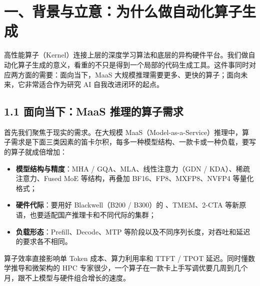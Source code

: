 \ReportContents
\SourceSeparator
\clearpage
\section{一、背景与立意：为什么做自动化算子生成}
高性能算子（Kernel）连接上层的深度学习算法和底层的异构硬件平台。我们做自动化算子生成的意义，看重的不只是得到一个局部的代码生成工具。这件事同时对应两方面的需要：面向当下，MaaS 大规模推理需要更多、更快的算子；面向未来，它非常适合作为研究 AI 自我改进闭环的起点。


\begin{DiagramBlock}
\end{DiagramBlock}
\subsection{1.1 面向当下：MaaS 推理的算子需求}
首先我们聚焦于现实的需求。在大规模 MaaS（Model-as-a-Service）推理中，算子需求是下面三类因素的笛卡尔积，每多一种模型结构、一款卡或一种负载，要写的算子就成倍增加：


\begin{itemize}
\item
\textbf{模型结构与精度}：MHA / GQA、MLA、线性注意力（GDN / KDA）、稀疏注意力、Fused MoE 等结构，再叠加 BF16、FP8、MXFP8、NVFP4 等量化格式；


\item
\textbf{硬件代际}：要用好 Blackwell（B200 / B300）的 、TMEM、2-CTA 等新原语，也要适配国产推理卡和不同代际的集群；


\item
\textbf{负载形态}：Prefill、Decode、MTP 等阶段以及不同序列长度，对吞吐和延迟的要求各不相同。


\end{itemize}

算子效率直接影响单 Token 成本、算力利用率和 TTFT / TPOT 延迟。同时懂数学推导和微架构的 HPC 专家很少，一个算子在一款卡上手写调优要几周到几个月，跟不上模型与硬件组合增长的速度。


